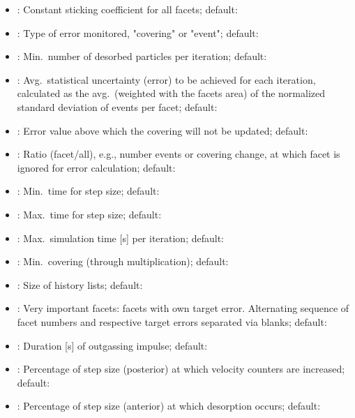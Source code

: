 \begin{itemize}[noitemsep,topsep=0pt, partopsep=0pt]
\item {}: Constant sticking coefficient for all facets; default:
\item {}: Type of error monitored, "covering" or "event"; default: 
\item {}: Min.\ number of desorbed particles per iteration; default: 
\item {}: Avg.\ statistical uncertainty (error) to be achieved for each iteration, calculated as the avg.\ (weighted with the facets area) of the normalized standard deviation of events per facet; default: 
\item {}: Error value above which the covering will not be updated; default:
\item {}: Ratio (facet/all), e.g., number events or covering change, at which facet is ignored for error calculation; default: 
\item {}: Min.\ time for step size; default:
\item {}: Max.\ time for step size; default:
\item {}: Max.\ simulation time [s] per iteration; default:
\item {}: Min.\ covering (through multiplication); default:
\item {}: Size of history lists; default:
\item {}: Very important facets: facets with own target error. Alternating sequence of facet numbers and respective target errors separated via blanks; default:\codew{[]}
\item {}: Duration [s] of outgassing impulse; default: 
\item {}: Percentage of step size (posterior) at which velocity counters are increased; default: 
\item {}: Percentage of step size (anterior) at which desorption occurs; default: 

\end{itemize}
